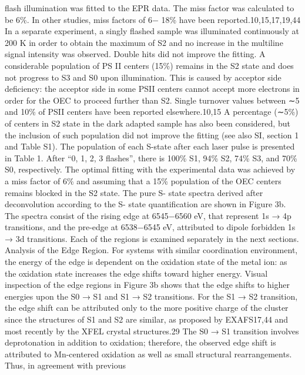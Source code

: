 \documentclass{article}
\begin{document}
\newpage


flash illumination was fitted to the EPR data. The miss factor
was calculated to be 6\%. In other studies, miss factors of 6−
18\% have been reported.10,15,17,19,44 In a separate experiment, a
singly flashed sample was illuminated continuously at 200 K in
order to obtain the maximum of S2 and no increase in the
multiline signal intensity was observed. Double hits did not
improve the fitting. A considerable population of PS II centers
(15\%) remains in the S2 state and does not progress to S3 and
S0 upon illumination. This is caused by acceptor side
deficiency: the acceptor side in some PSII centers cannot
accept more electrons in order for the OEC to proceed further
than S2. Single turnover values between ∼5 and 10\% of PSII
centers have been reported elsewhere.10,15 A percentage
(∼5\%) of centers in S2 state in the dark adapted sample has
also been considered, but the inclusion of such population did
not improve the fitting (see also SI, section 1 and Table S1).
The population of each S-state after each laser pulse is
presented in Table 1. After “0, 1, 2, 3 flashes”, there is 100\% S1,
94\% S2, 74\% S3, and 70\% S0, respectively.
The optimal fitting with the experimental data was achieved
by a miss factor of 6\% and assuming that a 15\% population of
the OEC centers remains blocked in the S2 state. The pure S-
state spectra derived after deconvolution according to the S-
state quantification are shown in Figure 3b. The spectra consist
of the rising edge at 6545−6560 eV, that represent 1s → 4p
transitions, and the pre-edge at 6538−6545 eV, attributed to
dipole forbidden 1s → 3d transitions. Each of the regions is
examined separately in the next sections.
Analysis of the Edge Region. For systems with similar
coordination environment, the energy of the edge is dependent
on the oxidation state of the metal ion: as the oxidation state
increases the edge shifts toward higher energy. Visual
inspection of the edge regions in Figure 3b shows that the
edge shifts to higher energies upon the S0 → S1 and S1 → S2
transitions. For the S1 → S2 transition, the edge shift can be
attributed only to the more positive charge of the cluster since
the structures of S1 and S2 are similar, as proposed by
EXAFS17,44 and most recently by the XFEL crystal
structures.29 The S0 → S1 transition involves deprotonation
in addition to oxidation; therefore, the observed edge shift is
attributed to Mn-centered oxidation as well as small structural
rearrangements. Thus, in agreement with previous
\end{document}
